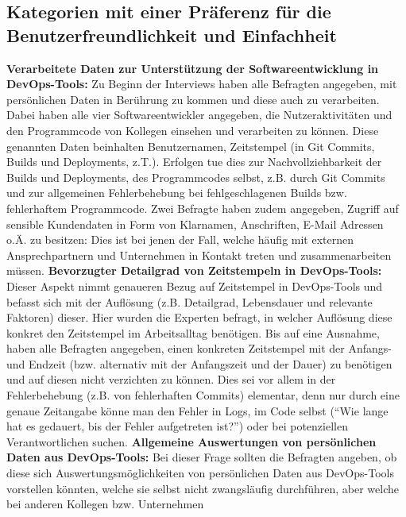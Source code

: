 \subsection{Kategorien mit einer Präferenz für die Benutzerfreundlichkeit und Einfachheit} \label{noprivacy}
\textbf{Verarbeitete Daten zur Unterstützung der Softwareentwicklung in DevOps-Tools:} \newline
Zu Beginn der Interviews haben alle Befragten angegeben, mit persönlichen Daten in Berührung zu kommen und diese auch zu verarbeiten. Dabei haben alle vier Softwareentwickler angegeben, die Nutzeraktivitäten und den Programmcode von Kollegen 
einsehen und verarbeiten zu können. Diese genannten Daten beinhalten Benutzernamen, Zeitstempel (in Git Commits, Builds und Deployments, z.T.).
Erfolgen tue dies zur Nachvollziehbarkeit der Builds und Deployments, des Programmcodes selbst, z.B. durch Git Commits und zur allgemeinen Fehlerbehebung bei fehlgeschlagenen Builds bzw. fehlerhaftem Programmcode. 
Zwei Befragte haben zudem angegeben, Zugriff auf sensible Kundendaten in Form von Klarnamen, Anschriften, E-Mail Adressen o.Ä. zu besitzen: Dies ist bei jenen der Fall, welche häufig mit externen Ansprechpartnern und Unternehmen in Kontakt treten 
und zusammenarbeiten müssen. \newline \newline
\textbf{Bevorzugter Detailgrad von Zeitstempeln in DevOps-Tools:} \newline
Dieser Aspekt nimmt genaueren Bezug auf Zeitstempel in DevOps-Tools und befasst sich mit der Auflösung (z.B. Detailgrad, Lebensdauer und relevante Faktoren) dieser. Hier wurden die Experten befragt, in welcher Auflösung diese konkret den Zeitstempel 
im Arbeitsalltag benötigen. Bis auf eine Ausnahme, haben alle Befragten angegeben, einen konkreten Zeitstempel mit der Anfangs- und Endzeit (bzw. alternativ mit der Anfangszeit und der Dauer) zu benötigen und auf diesen nicht verzichten zu können. Dies sei
vor allem in der Fehlerbehebung (z.B. von fehlerhaften Commits) elementar, denn nur durch eine genaue Zeitangabe könne man den Fehler in Logs, im Code selbst (\enquote{Wie lange hat es gedauert, bis der Fehler aufgetreten ist?}) oder bei potenziellen Verantwortlichen 
suchen. \newline \newline
\textbf{Allgemeine Auswertungen von persönlichen Daten aus DevOps-Tools:} \newline
Bei dieser Frage sollten die Befragten angeben, ob diese sich Auswertungsmöglichkeiten von persönlichen Daten aus DevOps-Tools vorstellen könnten, welche sie selbst nicht zwangsläufig durchführen, aber welche bei anderen Kollegen bzw. Unternehmen
